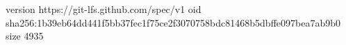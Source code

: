 version https://git-lfs.github.com/spec/v1
oid sha256:1b39eb64dd441f5bb37fec1f75ce2f3070758bdc81468b5dbffe097bea7ab9b0
size 4935
